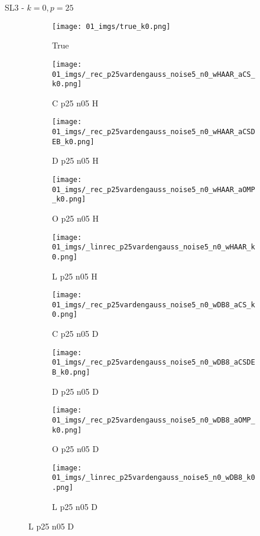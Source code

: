 \begin{frame}{SL3 - $k=0,p=25$}{}
\begin{figure}
\begin{subfigure}{0.1\textwidth}
\texttt{[image: 01\_imgs/true\_k0.png]}
\caption*{\Tiny True}
\end{subfigure}
\begin{subfigure}{0.1\textwidth}
\texttt{[image: 01\_imgs/\_rec\_p25vardengauss\_noise5\_n0\_wHAAR\_aCS\_k0.png]}
\caption*{\Tiny C p25 n05 H}
\end{subfigure}
\begin{subfigure}{0.1\textwidth}
\texttt{[image: 01\_imgs/\_rec\_p25vardengauss\_noise5\_n0\_wHAAR\_aCSDEB\_k0.png]}
\caption*{\Tiny D p25 n05 H}
\end{subfigure}
\begin{subfigure}{0.1\textwidth}
\texttt{[image: 01\_imgs/\_rec\_p25vardengauss\_noise5\_n0\_wHAAR\_aOMP\_k0.png]}
\caption*{\Tiny O p25 n05 H}
\end{subfigure}
\begin{subfigure}{0.1\textwidth}
\texttt{[image: 01\_imgs/\_linrec\_p25vardengauss\_noise5\_n0\_wHAAR\_k0.png]}
\caption*{\Tiny L p25 n05 H}
\end{subfigure}
\begin{subfigure}{0.1\textwidth}
\texttt{[image: 01\_imgs/\_rec\_p25vardengauss\_noise5\_n0\_wDB8\_aCS\_k0.png]}
\caption*{\Tiny C p25 n05 D}
\end{subfigure}
\begin{subfigure}{0.1\textwidth}
\texttt{[image: 01\_imgs/\_rec\_p25vardengauss\_noise5\_n0\_wDB8\_aCSDEB\_k0.png]}
\caption*{\Tiny D p25 n05 D}
\end{subfigure}
\begin{subfigure}{0.1\textwidth}
\texttt{[image: 01\_imgs/\_rec\_p25vardengauss\_noise5\_n0\_wDB8\_aOMP\_k0.png]}
\caption*{\Tiny O p25 n05 D}
\end{subfigure}
\begin{subfigure}{0.1\textwidth}
\texttt{[image: 01\_imgs/\_linrec\_p25vardengauss\_noise5\_n0\_wDB8\_k0.png]}
\caption*{\Tiny L p25 n05 D}
\end{subfigure}

\vspace{5pt}


\end{figure}
\end{frame}
